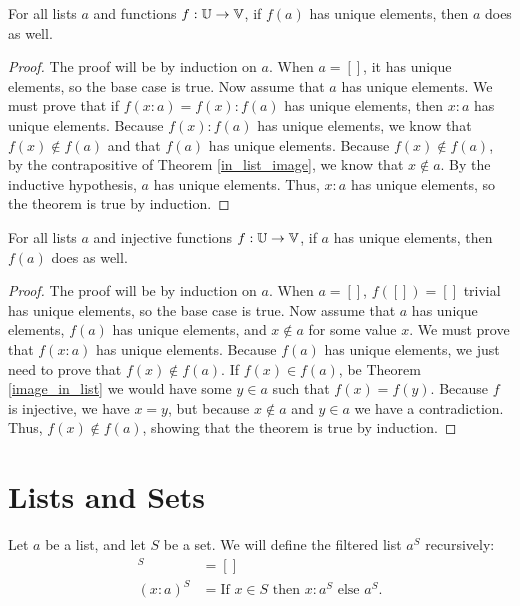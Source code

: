 \documentclass[../../math.tex]{subfiles}
\begin{document}
\begin{theorem} \label{list_image_unique}
    For all lists $a$ and functions $f : \mathbb{U} \to \mathbb{V}$, if $f(a)$ has unique
    elements, then $a$ does as well.
\end{theorem}
\begin{proof}
    The proof will be by induction on $a$.  When $a = []$, it has unique
    elements, so the base case is true.  Now assume that $a$ has unique
    elements.  We must prove that if $f(x : a) = f(x) : f(a)$ has unique
    elements, then $x : a$ has unique elements.  Because $f(x) : f(a)$ has
    unique elements, we know that $f(x) \notin f(a)$ and that $f(a)$ has unique
    elements.  Because $f(x) \notin f(a)$, by the contrapositive of Theorem
    \ref{in_list_image}, we know that $x \notin a$.  By the inductive
    hypothesis, $a$ has unique elements.  Thus, $x : a$ has unique elements, so
    the theorem is true by induction.
\end{proof}

\begin{theorem} \label{list_image_unique_inj}
    For all lists $a$ and injective functions $f : \mathbb{U} \to \mathbb{V}$, if $a$ has unique
    elements, then $f(a)$ does as well.
\end{theorem}
\begin{proof}
    The proof will be by induction on $a$.  When $a = []$, $f([]) = []$ trivial
    has unique elements, so the base case is true.  Now assume that $a$ has
    unique elements, $f(a)$ has unique elements, and $x \notin a$ for some value
    $x$.  We must prove that $f(x : a)$ has unique elements.  Because $f(a)$ has
    unique elements, we just need to prove that $f(x) \notin f(a)$.  If $f(x)
    \in f(a)$, be Theorem \ref{image_in_list} we would have some $y \in a$ such
    that $f(x) = f(y)$.  Because $f$ is injective, we have $x = y$, but because
    $x \notin a$ and $y \in a$ we have a contradiction.  Thus, $f(x) \notin
    f(a)$, showing that the theorem is true by induction.
\end{proof}

\section{Lists and Sets}

\begin{definition}
    Let $a$ be a list, and let $S$ be a set.  We will define the filtered list
    $a^S$ recursively:
    \begin{align*}
             []^S &= [] \\
        (x : a)^S &= \text{If $x \in S$ then $x : a^S$ else $a^S$}.
    \end{align*}
\end{definition}
\end{document}
